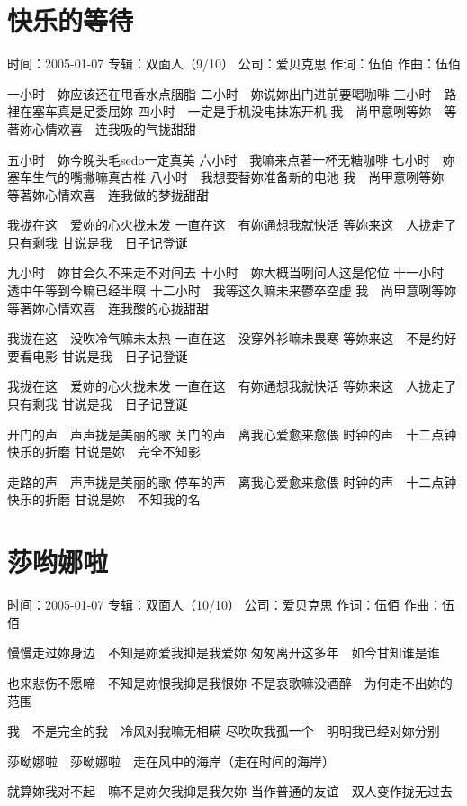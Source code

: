 \documentclass[UTF8,a4paper,oneside,twocolumn,12pt]{ctexbook}
\newcommand{\infopair}[2]{\textbullet #1：#2}
\newcommand{\zc}[1][伍佰]{\infopair{作词}{#1}}
\newcommand{\zq}[1][伍佰]{\infopair{作曲}{#1}}
\newcommand{\zj}[1]{\infopair{专辑}{#1}}
\newcommand{\sj}[1]{\infopair{时间}{#1}}
\newcommand{\gs}[1]{\infopair{公司}{#1}}
\newenvironment{info}{\begin{flushleft}\kaishu
	}
	{\end{flushleft}\normalsize\yahei\par}
\newenvironment{lyric}{
	}
{}
\begin{document}
\section{快乐的等待}
\begin{info}
	\sj{2005-01-07}
	\zj{双面人（9/10）}
	\gs{爱贝克思}
	\zc
	\zq
\end{info}
\begin{lyric}
	一小时　妳应该还在甩香水点胭脂
	二小时　妳说妳出门进前要喝咖啡
	三小时　路裡在塞车真是足委屈妳
	四小时　一定是手机没电抹冻开机
	我　尚甲意咧等妳　等著妳心情欢喜　连我吸的气拢甜甜

	五小时　妳今晚头毛sedo一定真美
	六小时　我嘛来点著一杯无糖咖啡
	七小时　妳塞车生气的嘴撇嘛真古椎
	八小时　我想要替妳准备新的电池
	我　尚甲意咧等妳　等著妳心情欢喜　连我做的梦拢甜甜

	我拢在这　爱妳的心火拢未发
	一直在这　有妳通想我就快活
	等妳来这　人拢走了只有剩我
	甘说是我　日子记登诞

	九小时　妳甘会久不来走不对间去
	十小时　妳大概当咧问人这是佗位
	十一小时　透中午等到今嘛已经半暝
	十二小时　我等这久嘛未来鬱卒空虚
	我　尚甲意咧等妳　等著妳心情欢喜　连我酸的心拢甜甜

	我拢在这　没吹冷气嘛未太热
	一直在这　没穿外衫嘛未畏寒
	等妳来这　不是约好要看电影
	甘说是我　日子记登诞

	我拢在这　爱妳的心火拢未发
	一直在这　有妳通想我就快活
	等妳来这　人拢走了只有剩我
	甘说是我　日子记登诞

	开门的声　声声拢是美丽的歌
	关门的声　离我心爱愈来愈偎
	时钟的声　十二点钟快乐的折磨
	甘说是妳　完全不知影

	走路的声　声声拢是美丽的歌
	停车的声　离我心爱愈来愈偎
	时钟的声　十二点钟快乐的折磨
	甘说是妳　不知我的名
\end{lyric}

\section{莎哟娜啦}
\begin{info}
	\sj{2005-01-07}
	\zj{双面人（10/10）}
	\gs{爱贝克思}
	\zc
	\zq
\end{info}
\begin{lyric}
	慢慢走过妳身边　不知是妳爱我抑是我爱妳
	匆匆离开这多年　如今甘知谁是谁

	也来悲伤不愿啼　不知是妳恨我抑是我恨妳
	不是哀歌嘛没酒醉　为何走不出妳的范围

	我　不是完全的我　冷风对我嘛无相瞒
	尽吹吹我孤一个　明明我已经对妳分别

	莎呦娜啦　莎呦娜啦　走在风中的海岸（走在时间的海岸）

	就算妳我对不起　嘛不是妳欠我抑是我欠妳
	当作普通的友谊　双人变作拢无过去
\end{lyric}
\end{document}
